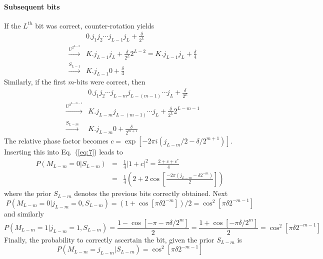 \documentclass[11pt,oneside,final]{huthesis}%
\begin{document}
\paragraph{Subsequent bits}
If the $L^{th}$ bit was correct, counter-rotation yields
\begin{eqnarray}
	&&0.j_1j_2\cdots j_{L-1}j_L+\frac{\delta}{2^{L}}\\
	&\xrightarrow{U^{2^{L-2}}}&K.j_{L-1}j_L+\frac{\delta}{2^{L}} 2^{L-2}=K.j_{L-1}j_L+\frac{\delta}{4} \\
&\xrightarrow{S_{L-1}}&K.j_{L-1}0+\frac{\delta}{4}
\end{eqnarray}
Similarly, if the first $m$-bits were correct, then 
\begin{eqnarray}
	&&0.j_1j_2\cdots j_{L-m}j_{L-(m-1)}\cdots j_L+\frac{\delta}{2^{L}}\\
	&\xrightarrow{U^{2^{L-m-1}}}&K.j_{L-m}j_{L-(m-1)}\cdots j_L+\frac{\delta}{2^{L}} 2^{L-m-1}\\
	&\xrightarrow{S_{L-m}}&K.j_{L-m}0+\frac{\delta}{2^{m+1}}
\end{eqnarray}
The relative phase factor becomes $c=\exp[-2\pi i (j_{L-m}/2-\delta/2^{m+1})]$.  
Inserting this into Eq.~(\ref{eq:7}) leads to
\begin{eqnarray}
	P(M_{L-m}=0|S_{L-m})&=& \frac{1}{4}\left|{1+c}\right|^2=\frac{2+c+c^*}{4}\\
	&=& \frac{1}{4}\left(2+2\cos\left[\frac{-2\pi(j_{L-m}-\delta2^{-m})}{2}\right]\right)
\end{eqnarray}
where the prior $S_{L-m}$ denotes the previous bits correctly obtained.
Next $$P(M_{L-m}=0|j_{L-m}=0,S_{L-m})=(1+\cos[\pi\delta2^{-m}])/2=\cos^2[\pi\delta2^{-m-1}]$$
and similarly 
$$P(M_{L-m}=1|j_{L-m}=1,S_{L-m})=\frac{1-\cos[-\pi-\pi\delta/2^{m}]}{2}=\frac{1+\cos[-\pi\delta/2^{m}]}{2}=\cos^2[\pi\delta2^{-m-1}]$$ 
Finally, the probability to correctly ascertain the bit, given the prior $S_{L-m}$ is
\begin{equation}
	P(M_{L-m}=j_{L-m}|S_{L-m})=\cos^2[\pi\delta2^{-m-1}]
	\label{eq:25}
\end{equation}
\end{document}
